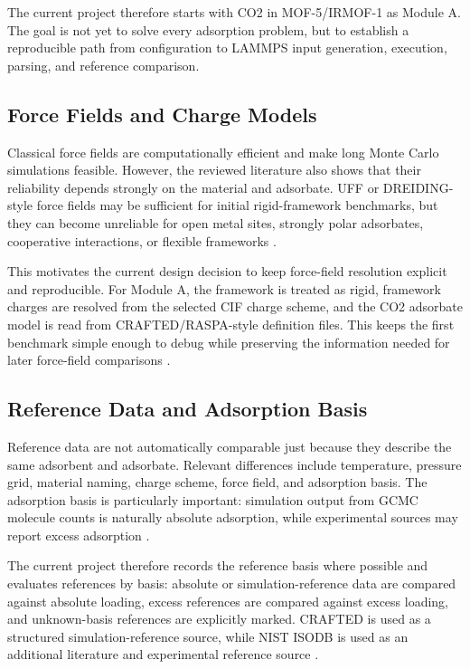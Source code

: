 The current project therefore starts with CO2 in MOF-5/IRMOF-1 as Module A.
The goal is not yet to solve every adsorption problem, but to establish a reproducible path from configuration to LAMMPS input generation, execution, parsing, and reference comparison.

\subsection{Force Fields and Charge Models}

Classical force fields are computationally efficient and make long Monte Carlo simulations feasible.
However, the reviewed literature also shows that their reliability depends strongly on the material and adsorbate.
UFF or DREIDING-style force fields may be sufficient for initial rigid-framework benchmarks, but they can become unreliable for open metal sites, strongly polar adsorbates, cooperative interactions, or flexible frameworks \cite{tao2022gcmc,edwards2026mlipmc,wang2026flexible}.

This motivates the current design decision to keep force-field resolution explicit and reproducible.
For Module A, the framework is treated as rigid, framework charges are resolved from the selected CIF charge scheme, and the CO2 adsorbate model is read from CRAFTED/RASPA-style definition files.
This keeps the first benchmark simple enough to debug while preserving the information needed for later force-field comparisons \cite{crafted2023,edwards2026mlipmc}.

\subsection{Reference Data and Adsorption Basis}

Reference data are not automatically comparable just because they describe the same adsorbent and adsorbate.
Relevant differences include temperature, pressure grid, material naming, charge scheme, force field, and adsorption basis.
The adsorption basis is particularly important: simulation output from GCMC molecule counts is naturally absolute adsorption, while experimental sources may report excess adsorption \cite{tao2022gcmc,nistadsorption}.

The current project therefore records the reference basis where possible and evaluates references by basis:
absolute or simulation-reference data are compared against absolute loading, excess references are compared against excess loading, and unknown-basis references are explicitly marked.
CRAFTED is used as a structured simulation-reference source, while NIST ISODB is used as an additional literature and experimental reference source \cite{crafted2023,craftedzenodo,nistadsorption}.

